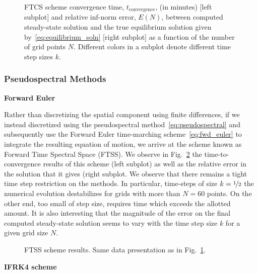 \documentclass[11pt]{article}
\begin{document}
\begin{figure}[!h]
    \centering
    \caption{FTCS scheme convergence time, $t_{\mathrm{convergence}}$, (in minutes) [left subplot] and relative inf-norm error, $E(N)$, between computed steady-state solution and the true equilibrium solution given by~\eqref{eq:equilibrium_soln} [right subplot] as a function of the number of grid points $N$. Different colors in a subplot denote different time step sizes $k$. }
    \label{fig:ftcs_scheme}
\end{figure}
\newpage
\subsubsection{Pseudospectral Methods}

\noindent\textbf{Forward Euler}

Rather than discretizing the spatial component using finite differences, if we instead discretized using the pseudospectral method~\eqref{eq:pseudospectral} and subsequently use the Forward Euler time-marching scheme~\eqref{eq:fwd_euler} to integrate the resulting equation of motion, we arrive at the scheme known as Forward Time Spectral Space (FTSS). We observe in Fig.~\ref{fig:ftss_scheme} the time-to-convergence results of this scheme (left subplot) as well as the relative error in the solution that it gives (right subplot. We observe that there remains a tight time step restriction on the methods. In particular, time-steps of size $k=\nicefrac{1}{2}$ the numerical evolution destabilizes for grids with more than $N=60$ points. On the other end, too small of step size, requires time which exceeds the allotted amount. It is also interesting that the magnitude of the error on the final computed steady-state solution seems to vary with the time step size $k$ for a given grid size $N$. \\

\begin{figure}[!h]
    \centering
    \caption{FTSS scheme results. Same data presentation as in Fig.~\ref{fig:ftcs_scheme}.}
    \label{fig:ftss_scheme}
\end{figure}

\noindent\textbf{IFRK4 scheme}
\end{document}

